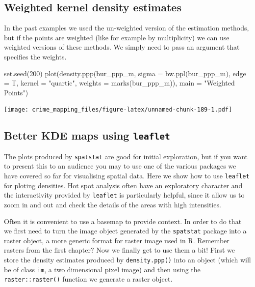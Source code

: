 \documentclass[
  krantz2]{krantz}
\makeatletter
\newenvironment{Shaded}{\begin{snugshade}}{\end{snugshade}}
\newcommand{\AttributeTok}[1]{\textcolor[rgb]{0.61,0.61,0.61}{#1}}
\newcommand{\DecValTok}[1]{\textcolor[rgb]{0.06,0.06,0.06}{#1}}
\newcommand{\FunctionTok}[1]{\textcolor[rgb]{0,0,0}{#1}}
\newcommand{\NormalTok}[1]{#1}
\newcommand{\StringTok}[1]{\textcolor[rgb]{0.5,0.5,0.5}{#1}}
\newenvironment{kframe}{%
\medskip{}
\setlength{\fboxsep}{.8em}
 \def\at@end@of@kframe{}%
 \ifinner\ifhmode%
  \def\at@end@of@kframe{\end{minipage}}%
  \begin{minipage}{\columnwidth}%
 \fi\fi%
 \def\FrameCommand##1{\hskip\@totalleftmargin \hskip-\fboxsep
 \colorbox{shadecolor}{##1}\hskip-\fboxsep
     \hskip-\linewidth \hskip-\@totalleftmargin \hskip\columnwidth}%
 \MakeFramed {\advance\hsize-\width
   \@totalleftmargin\z@ \linewidth\hsize
   \@setminipage}}%
 {\par\unskip\endMakeFramed%
 \at@end@of@kframe}
\renewenvironment{Shaded}{\begin{kframe}}{\end{kframe}}
\makeatother
\begin{document}
\hypertarget{weighted-kernel-density-estimates}{%
\subsection{Weighted kernel density estimates}\label{weighted-kernel-density-estimates}}

In the past examples we used the un-weighted version of the estimation methods, but if the points are weighted (like for example by multiplicity) we can use weighted versions of these methods. We simply need to pass an argument that specifies the weights.

\begin{Shaded}
\begin{Highlighting}[]
\FunctionTok{set.seed}\NormalTok{(}\DecValTok{200}\NormalTok{)}
\FunctionTok{plot}\NormalTok{(}\FunctionTok{density.ppp}\NormalTok{(bur\_ppp\_m, }\AttributeTok{sigma =} \FunctionTok{bw.ppl}\NormalTok{(bur\_ppp\_m), }\AttributeTok{edge =}\NormalTok{ T, }
                 \AttributeTok{kernel =} \StringTok{"quartic"}\NormalTok{,}
                 \AttributeTok{weights =} \FunctionTok{marks}\NormalTok{(bur\_ppp\_m)), }
     \AttributeTok{main =} \StringTok{"Weighted Points"}\NormalTok{)}
\end{Highlighting}
\end{Shaded}

\texttt{[image: crime\_mapping\_files/figure-latex/unnamed-chunk-189-1.pdf]}

\hypertarget{better-kde-maps-using-leaflet}{%
\subsection{\texorpdfstring{Better KDE maps using \texttt{leaflet}}{Better KDE maps using leaflet}}\label{better-kde-maps-using-leaflet}}

The plots produced by \texttt{spatstat} are good for initial exploration, but if you want to present this to an audience you may to use one of the various packages we have covered so far for visualising spatial data. Here we show how to use \texttt{leaflet} for ploting densities. Hot spot analysis often have an exploratory character and the interactivity provided by \texttt{leaflet} is particularly helpful, since it allow us to zoom in and out and check the details of the areas with high intensities.

Often it is convenient to use a basemap to provide context. In order to do that we first need to turn the image object generated by the \texttt{spatstat} package into a raster object, a more generic format for raster image used in R. Remember rasters from the first chapter? Now we finally get to use them a bit! First we store the density estimates produced by \texttt{density.ppp()} into an object (which will be of class \texttt{im}, a two dimensional pixel image) and then using the \texttt{raster::raster()} function we generate a raster object.
\end{document}
